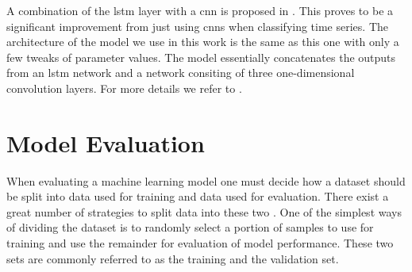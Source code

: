 A combination of the \gls{lstm} layer with a \gls{cnn} is proposed in \citep{karim_majumdar_darabi_chen_2018}. This proves to be a significant improvement from just using \gls{cnn}s when classifying time series. The architecture of the model we use in this work is the same as this one with only a few tweaks of parameter values. The model essentially concatenates the outputs from an \gls{lstm} network and a network consiting of three one-dimensional convolution layers. For more details we refer to \citep{karim_majumdar_darabi_chen_2018}.

\section{Model Evaluation}






When evaluating a machine learning model one must decide how a dataset should be split into data used for training and data used for evaluation. There exist a great number of strategies to split data into these two \citep{raschka}. One of the simplest ways of dividing the dataset is to randomly select a portion of samples to use for training and use the remainder for evaluation of model performance. These two sets are commonly referred to as the training and the validation set.

